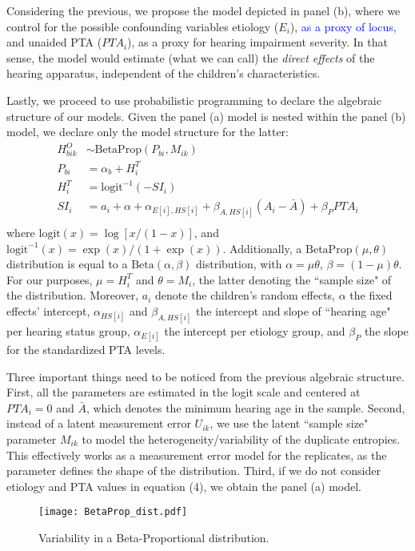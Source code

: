 Considering the previous, we propose the model depicted in panel (b), where we control for the possible confounding variables etiology ($E_{i}$), \textcolor{blue}{as a proxy of locus}, and unaided PTA ($PTA_{i}$), as a proxy for hearing impairment severity. In that sense, the model would estimate (what we can call) the \textit{direct effects} of the hearing apparatus, independent of the children's characteristics.

Lastly, we proceed to use probabilistic programming to declare the algebraic structure of our models. Given the panel (a) model is nested within the panel (b) model, we declare only the model structure for the latter:
%
\begin{align}
	H^{O}_{bik} & \sim \text{BetaProp} \left( P_{bi}, M_{ik} \right) \\ 
	P_{bi} &= \alpha_{b} + H^{T}_{i} \\
	H^{T}_{i} &= \text{logit}^{-1}( -SI_{i} ) \\
	SI_{i} & = a_{i} + \alpha + \alpha_{E[i],HS[i]} + \beta_{A, HS[i]} (A_{i} - \bar{A}) + \beta_{P} PTA_{i} \\ 
\end{align}
%
where $\text{logit}(x) = \log \left[ x / ( 1 - x ) \right]$, and $\text{logit}^{-1}(x) = \exp(x) / ( 1 + \exp(x) ) $. Additionally, a $\text{BetaProp}(\mu, \theta)$ distribution is equal to a $\text{Beta}(\alpha, \beta)$ distribution, with $\alpha=\mu \theta$, $\beta=(1-\mu)\theta$. For our purposes, $\mu = H^{T}_{i}$ and $\theta = M_{i}$, the latter denoting the ``sample size" of the distribution. Moreover, $a_{i}$ denote the children's random effects, $\alpha$ the fixed effects' intercept, $\alpha_{HS[i]}$ and $\beta_{A, HS[i]}$ the intercept and slope of ``hearing age" per hearing status group, $\alpha_{E[i]}$ the intercept per etiology group, and $\beta_{P}$ the slope for the standardized PTA levels. 

Three important things need to be noticed from the previous algebraic structure. First, all the parameters are estimated in the logit scale and centered at $PTA_{i}=0$ and $\bar{A}$, which denotes the minimum hearing age in the sample. Second, instead of a latent measurement error $U_{ik}$, we use the latent ``sample size" parameter $M_{ik}$ to model the heterogeneity/variability of the duplicate entropies. This effectively works as a measurement error model for the replicates, as the parameter defines the shape of the distribution. Third, if we do not consider etiology and PTA values in equation (4), we obtain the panel (a) model.
%
\begin{figure}
	\centering
	\texttt{[image: BetaProp\_dist.pdf]}
	\caption[Variability in a Beta-Proportional distribution]{Variability in a Beta-Proportional distribution.}
	\label{fig:BetaProp}
\end{figure}
%
%
